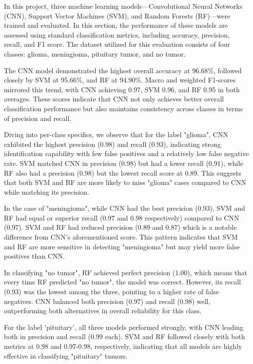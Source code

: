\documentclass[conference]{IEEEtran}
\begin{document}
In this project, three machine learning models—Convolutional Neural Networks (CNN), Support Vector Machines (SVM), and Random Forests (RF)—were trained and evaluated. In this section, the performance of these models are assessed using standard classification metrics, including accuracy, precision, recall, and F1 score. The dataset utilized for this evaluation consists of four classes: glioma, meningioma, pituitary tumor, and no tumor.

The CNN model demonstrated the highest overall accuracy at 96.68\%, followed closely by SVM at 95.66\%, and RF at 94.90\%. Macro and weighted F1-scores mirrored this trend, with CNN achieving 0.97, SVM 0.96, and RF 0.95 in both averages. These scores indicate that CNN not only achieves better overall classification performance but also maintains consistency across classes in terms of precision and recall.

Diving into per-class specifics, we observe that for the label "glioma", CNN exhibited the highest precision (0.98) and recall (0.93), indicating strong identification capability with few false positives and a relatively low false negative rate. SVM matched CNN in precision (0.98) but had a lower recall (0.91), while RF also had a precision (0.98) but the lowest recall score at 0.89. This suggests that both SVM and RF are more likely to miss "glioma" cases compared to CNN while matching its precision.

In the case of "meningioma", while CNN had the best precision (0.93), SVM and RF had equal or superior recall (0.97 and 0.98 respectively) compared to CNN (0.97). SVM and RF had reduced precision (0.89 and 0.87) which is a notable difference from CNN's aforementioned score. This pattern indicates that SVM and RF are more sensitive in detecting "meningioma" but may yield more false positives than CNN.

In classifying "no tumor", RF achieved perfect precision (1.00), which means that every time RF predicted "no tumor", the model was correct. However, its recall (0.93) was the lowest among the three, pointing to a higher rate of false negatives. CNN balanced both precision (0.97) and recall (0.98) well, outperforming both alternatives in overall reliability for this class.

For the label 'pituitary', all three models performed strongly, with CNN leading both in precision and recall (0.99 each). SVM and RF followed closely with both metrics at 0.98 and 0.97-0.98, respectively, indicating that all models are highly effective in classifying "pituitary" tumors.
\end{document}
